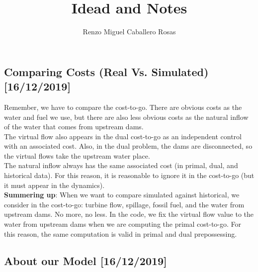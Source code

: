 \documentclass[12pt]{article}
\theoremstyle{definition}
\theoremstyle{remark}
\begin{document}
\title{Idead and Notes}
\author{Renzo Miguel Caballero Rosas} 
\maketitle

\subsection*{Comparing Costs (Real Vs. Simulated) [16/12/2019]}

Remember, we have to compare the cost-to-go. There are obvious costs as the water and fuel we use, but there are also less obvious costs as the natural inflow of the water that comes from upstream dams.\\
The virtual flow also appears in the dual cost-to-go as an independent control with an associated cost. Also, in the dual problem, the dams are disconnected, so the virtual flows take the upstream water place.\\
The natural inflow always has the same associated cost (in primal, dual, and historical data). For this reason, it is reasonable to ignore it in the cost-to-go (but it must appear in the dynamics).\\
\textbf{Summering up}: When we want to compare simulated against historical, we consider in the cost-to-go: turbine flow, spillage, fossil fuel, and the water from upstream dams. No more, no less. In the code, we fix the virtual flow value to the water from upstream dams when we are computing the primal cost-to-go. For this reason, the same computation is valid in primal and dual prepossessing.

\subsection*{About our Model [16/12/2019]}
\end{document}
